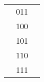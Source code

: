 \documentclass{article}
\begin{document}
\begin{adjustbox}{width=1\textwidth}
\begin{tabular}{|ll|llllllll|}
\multicolumn{1}{|l|}{}                    & 011      & \multicolumn{8}{l|}{}                                                                                                                                                                                                                                                                                                                                                                                                                                                                          \\ \cline{2-2}
\multicolumn{1}{|l|}{}                    & 100      & \multicolumn{8}{l|}{}                                                                                                                                                                                                                                                                                                                                                                                                                                                                          \\ \cline{2-2}
\multicolumn{1}{|l|}{}                    & 101      & \multicolumn{8}{l|}{}                                                                                                                                                                                                                                                                                                                                                                                                                                                                          \\ \cline{2-2}
\multicolumn{1}{|l|}{}                    & 110      & \multicolumn{8}{l|}{}                                                                                                                                                                                                                                                                                                                                                                                                                                                                          \\ \cline{2-2}
\multicolumn{1}{|l|}{}                    & 111      & \multicolumn{8}{l|}{}                                                                                                                                                                                                                                                                                                                                                                                                                                                                          \\ \hline

\end{tabular}
\end{adjustbox}
\end{document}
